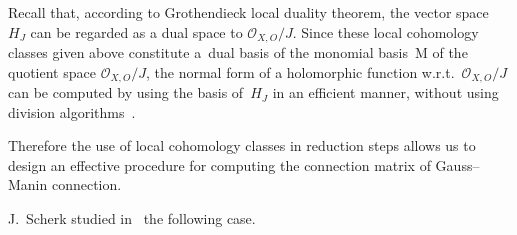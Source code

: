 \documentclass[10pt,a4paper]{amsart}
\numberwithin{equation}{section}
\begin{document}
\begin{Remark}Recall that, according to Grothendieck local duality theorem, the vector space~$H_J$ can be regarded as a dual space to ${\mathcal O}_{X,O}/J$. Since these local cohomology classes given above constitute a~dual basis of the monomial basis~M of the quotient space $ {\mathcal O}_{X,O}/J$, the normal form of a holomorphic function w.r.t.~${\mathcal O}_{X,O}/J$ can be computed by using the basis of~$H_J$
in an efficient manner, without using division algorithms~\cite{TNN}.

Therefore the use of local cohomology classes in reduction steps allows us to design an effective procedure for computing the connection matrix of Gauss--Manin connection.
\end{Remark}

J.~Scherk studied in~\cite{Sch} the following case.
\end{document}
